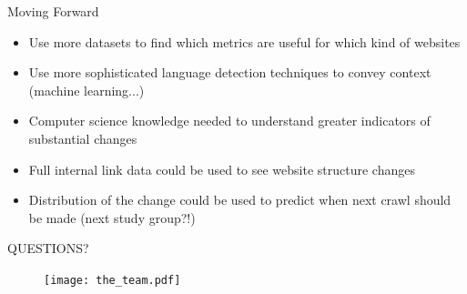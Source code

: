 \documentclass[10pt]{beamer}
\begin{document}
\begin{frame}{Moving Forward}
\large
\begin{itemize}
\item Use more datasets to find which metrics are useful for which kind of websites
\item Use more sophisticated language detection techniques to convey context (machine learning...)
\item Computer science knowledge needed to understand greater indicators of substantial changes
\item Full internal link data could be used to see website structure changes
\item Distribution of the change could be used to predict when next crawl should be made (next study group?!)
\end{itemize}
\end{frame}

\begin{frame}

\LARGE \centering QUESTIONS?

\begin{figure}
\centering
\texttt{[image: the\_team.pdf]}
\end{figure}

\end{frame}
\end{document}
